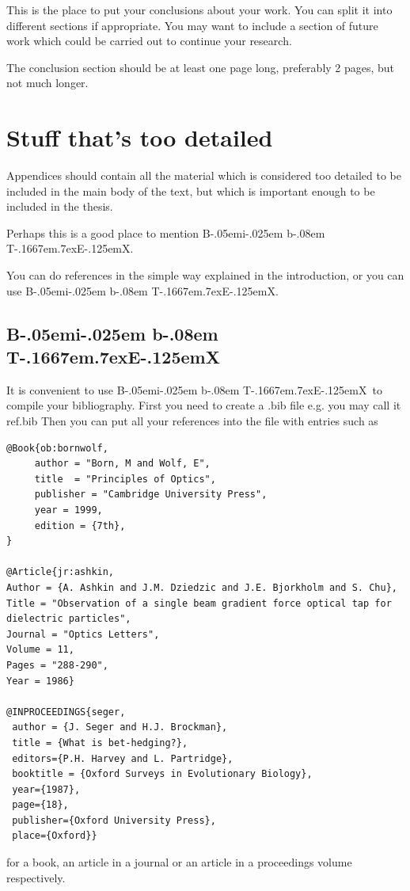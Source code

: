 \documentclass[12pt,a4paper]{report}
\def\BibTeX{{\rm B\kern-.05em{\sc i\kern-.025em b}\kern-.08em
    T\kern-.1667em\lower.7ex\hbox{E}\kern-.125emX}}
\begin{document}
This is the place to put your conclusions about your work. You can
split it into different sections if appropriate. You may want to include
a section of future work which could be carried out to continue your
research.

The conclusion section should be at least one page long, preferably 2
pages, but not much longer.

\appendix

\chapter{Stuff that's too detailed}

Appendices should contain all the material which is considered too
detailed to be included in the main body of the text, but which is
important enough to be included in the thesis.

Perhaps this is a good place to mention \BibTeX.

You can do references in the simple way explained in the introduction,
or you can use \BibTeX.


\section{\BibTeX}
\label{sec:bibtex}

It is convenient to use \BibTeX\ to compile your bibliography.  First
you need to create a .bib file e.g.  you may call it ref.bib Then you
can put all your references into the file with entries such as
\begin{verbatim}
@Book{ob:bornwolf,
     author = "Born, M and Wolf, E",
     title  = "Principles of Optics",
     publisher = "Cambridge University Press",
     year = 1999,
     edition = {7th},
}

@Article{jr:ashkin,
Author = {A. Ashkin and J.M. Dziedzic and J.E. Bjorkholm and S. Chu},
Title = "Observation of a single beam gradient force optical tap for 
dielectric particles",
Journal = "Optics Letters",
Volume = 11,
Pages = "288-290",
Year = 1986}

@INPROCEEDINGS{seger,
 author = {J. Seger and H.J. Brockman},
 title = {What is bet-hedging?},
 editors={P.H. Harvey and L. Partridge},
 booktitle = {Oxford Surveys in Evolutionary Biology},
 year={1987},
 page={18},
 publisher={Oxford University Press},
 place={Oxford}}
\end{verbatim}
for a book, an article in a journal or an article in a proceedings volume
respectively.
\end{document}
